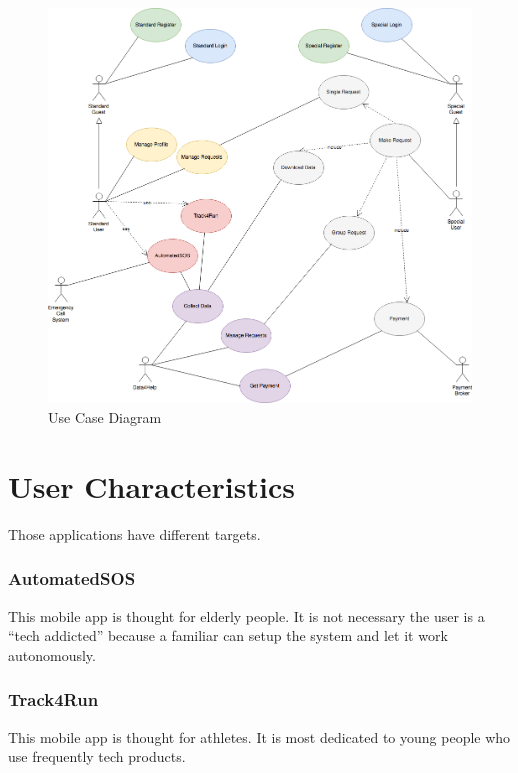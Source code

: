\begin{figure}[H]
\begin{center}
  \includegraphics[width=\textwidth]{img/UseCase_Diagram.png}
  \hspace{0.05\linewidth}
  \centering
  \caption{Use Case Diagram}
  \label{img:UseCase_Diagram}
\end{center}
\end{figure}

\section{User Characteristics}
Those applications have different targets.

\subsubsection{AutomatedSOS}
This mobile app is thought for elderly people. It is not necessary the user is a “tech addicted” because a familiar can setup the system and let it work autonomously.

\subsubsection{Track4Run}
This mobile app is thought for athletes. It is most dedicated to young people who use frequently tech products.

